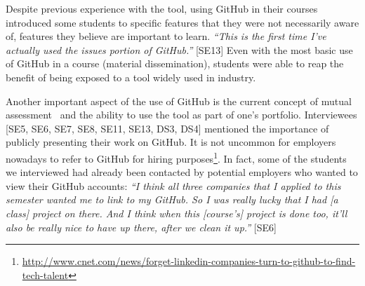 Despite previous experience with the tool, using GitHub in their courses introduced some students to specific features that they were not necessarily aware of, features they believe are important to learn. \textit{``This is the first time I've actually used the issues portion of GitHub.''} [SE13] Even with the most basic use of GitHub in a course (material dissemination), students were able to reap the benefit of being exposed to a tool widely used in industry.


%
Another important aspect of the use of GitHub is the current concept of mutual assessment~\cite{Singer2013} and the ability to use the tool as part of one's portfolio. Interviewees [SE5, SE6, SE7, SE8, SE11, SE13, DS3, DS4] mentioned the importance of publicly presenting their work on GitHub. It is not uncommon for employers nowadays to refer to GitHub for hiring purposes\footnote{\href{http://www.cnet.com/news/forget-linkedin-companies-turn-to-github-to-find-tech-talent}{http://www.cnet.com/news/forget-linkedin-companies-turn-to-github-to-find-tech-talent}}. In fact, some of the students we interviewed had already been contacted by potential employers who wanted to view their GitHub accounts: \textit{``I think all three companies that I applied to this semester wanted me to link to my GitHub. So I was really lucky that I had [a class] project on there. And I think when this [course's] project is done too, it'll also be really nice to have up there, after we clean it up.''} [SE6]

